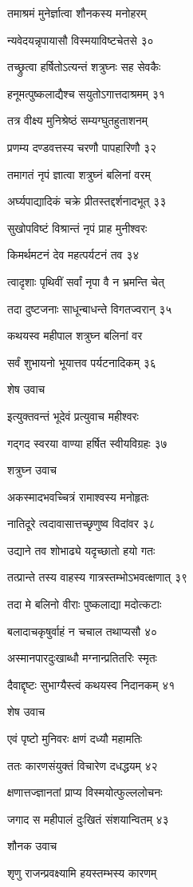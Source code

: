 तमाश्रमं मुनेर्ज्ञात्वा शौनकस्य मनोहरम्

न्यवेदयन्नृपायासौ विस्मयाविष्टचेतसे ३०

तच्छ्रुत्वा हर्षितोऽत्यन्तं शत्रुघ्नः सह सेवकैः

हनूमत्पुष्कलाद्यैश्च सयुतोऽगात्तदाश्रमम् ३१

तत्र वीक्ष्य मुनिश्रेष्ठं सम्यग्घुतहुताशनम्

प्रणम्य दण्डवत्तस्य चरणौ पापहारिणौ ३२

तमागतं नृपं ज्ञात्वा शत्रुघ्नं बलिनां वरम्

अर्घ्यपाद्यादिकं चक्रे प्रीतस्तद्दर्शनादभूत् ३३

सुखोपविष्टं विश्रान्तं नृपं प्राह मुनीश्वरः

किमर्थमटनं देव महत्पर्यटनं तव ३४

त्वादृशाः पृथिवीं सर्वां नृपा वै न भ्रमन्ति चेत्

तदा दुष्टजनाः साधून्बाधन्ते विगतज्वरान् ३५

कथयस्व महीपाल शत्रुघ्न बलिनां वर

सर्वं शुभायनो भूयात्तव पर्यटनादिकम् ३६

शेष उवाच

इत्युक्तवन्तं भूदेवं प्रत्युवाच महीश्वरः

गद्गद स्वरया वाण्या हर्षित स्वीयविग्रहः ३७

शत्रुघ्न उवाच

अकस्मादभवच्चित्रं रामाश्वस्य मनोहृतः

नातिदूरे त्वदावासात्तच्छृणुष्व विदांवर ३८

उद्याने तव शोभाढ्ये यदृच्छातो हयो गतः

तत्प्रान्ते तस्य वाहस्य गात्रस्तम्भोऽभवत्क्षणात् ३९

तदा मे बलिनो वीराः पुष्कलाद्या मदोत्कटाः

बलादाचकृषुर्वाहं न चचाल तथाप्यसौ ४०

अस्मानपारदुःखाब्धौ मग्नान्प्रतितरिः स्मृतः

दैवाद्दृष्टः सुभाग्यैस्त्वं कथयस्व निदानकम् ४१

शेष उवाच

एवं पृष्टो मुनिवरः क्षणं दध्यौ महामतिः

ततः कारणसंयुक्तं विचारेण दधद्धयम् ४२

क्षणात्तज्ज्ञानतां प्राप्य विस्मयोत्फुल्ललोचनः

जगाद स महीपालं दुःखितं संशयान्वितम् ४३

शौनक उवाच

शृणु राजन्प्रवक्ष्यामि हयस्तम्भस्य कारणम्

